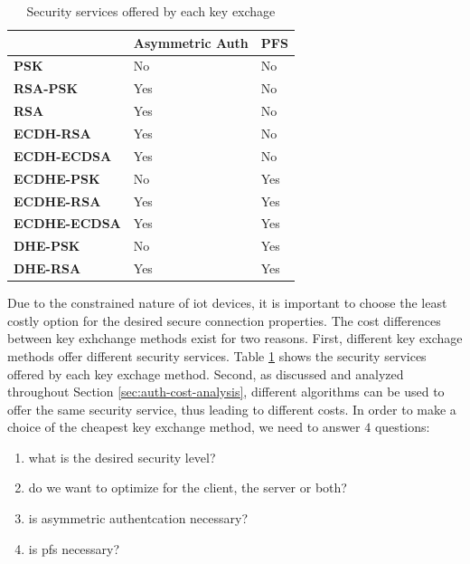 \documentclass{llncs}
\begin{document}
\begin{table}[]
\begin{tabular}{|l|l|l|}
\hline
                     & \textbf{Asymmetric Auth} & \textbf{PFS} \\ \hline
\textbf{PSK}         & No                       & No           \\ \hline
\textbf{RSA-PSK}     & Yes                      & No           \\ \hline
\textbf{RSA}         & Yes                      & No           \\ \hline
\textbf{ECDH-RSA}    & Yes                      & No           \\ \hline
\textbf{ECDH-ECDSA}  & Yes                      & No           \\ \hline
\textbf{ECDHE-PSK}   & No                       & Yes          \\ \hline
\textbf{ECDHE-RSA}   & Yes                      & Yes          \\ \hline
\textbf{ECDHE-ECDSA} & Yes                      & Yes          \\ \hline
\textbf{DHE-PSK}     & No                       & Yes          \\ \hline
\textbf{DHE-RSA}     & Yes                      & Yes          \\ \hline
\end{tabular}
\centering \caption{\label{table:key-exch-sec-ser} Security services offered by each key exchage}
\end{table}


Due to the constrained nature of \gls{iot} devices, it is important to choose the least costly option for the desired secure
connection properties.
The cost differences between key exhchange methods exist for two reasons. First, different key exchage methods offer different
security services. Table \ref{table:key-exch-sec-ser} shows the security services offered by each key exchage method. Second, as
discussed and analyzed throughout Section \ref{sec:auth-cost-analysis}, different algorithms can be used to offer the same 
security service, thus leading to different costs. In order to make a choice of the cheapest key 
exchange method, we need to answer $4$ questions:

\begin{enumerate}
  \item what is the desired security level?
  \item do we want to optimize for the client, the server or both?
  \item is asymmetric authentcation necessary?
  \item is \gls{pfs} necessary?
\end{enumerate}
\end{document}
